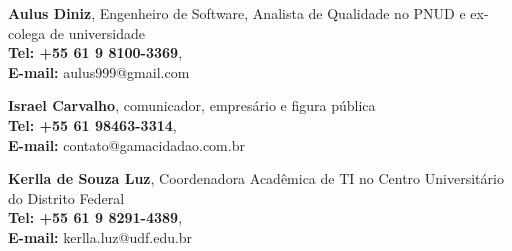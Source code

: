
\textbf{Aulus Diniz}, Engenheiro de Software, Analista de Qualidade no PNUD e ex-colega de universidade \\
\textbf{Tel: +55 61 9 8100-3369}, \\
\textbf{E-mail:} aulus999@gmail.com

\divider

\textbf{Israel Carvalho}, comunicador, empresário e figura pública \\
\textbf{Tel: +55 61 98463-3314}, \\
\textbf{E-mail:} contato@gamacidadao.com.br

\divider

\textbf{Kerlla de Souza Luz}, Coordenadora Acadêmica de TI no Centro Universitário do Distrito Federal \\
\textbf{Tel: +55 61 9 8291-4389}, \\
\textbf{E-mail:} kerlla.luz@udf.edu.br
